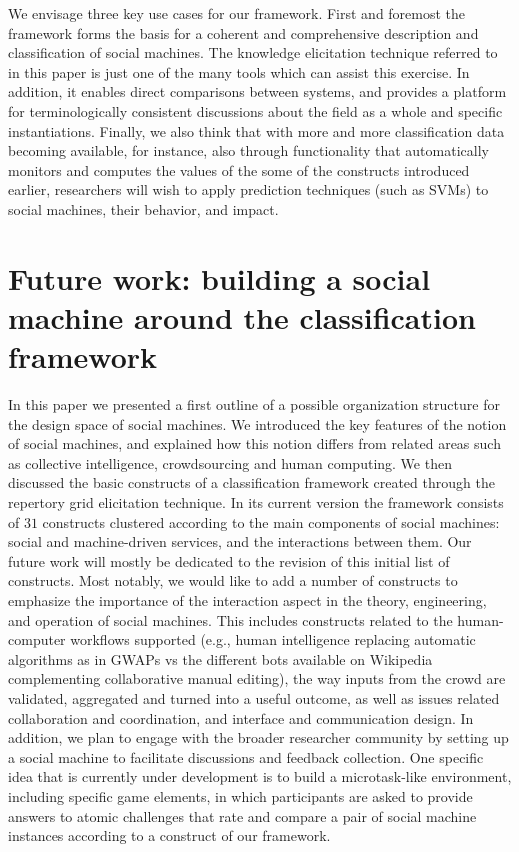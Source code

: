 \documentclass{sig-alternate}
\begin{document}
We envisage three key use cases for our framework. First and foremost the framework forms the basis for a coherent and comprehensive description and classification of social machines. The knowledge elicitation technique referred to in this paper is just one of the many tools which can assist this exercise. In addition, it enables direct comparisons between systems, and provides a platform for terminologically consistent discussions about the field as a whole and specific instantiations. Finally, we also think that with more and more classification data becoming available, for instance, also through functionality that automatically monitors and computes the values of the some of the constructs introduced earlier, researchers will wish to apply prediction techniques (such as SVMs) to social machines, their behavior, and impact.

\section{Future work: building a social machine around the classification framework}
In this paper we presented a first outline of a possible organization structure for the design space of social machines. We introduced the key features of the notion of social machines, and explained how this notion differs from related areas such as collective intelligence, crowdsourcing and human computing. We then discussed the basic constructs of a classification framework created through the repertory grid elicitation technique. In its current version the framework consists of $31$ constructs clustered according to the main components of social machines: social and machine-driven services, and the interactions between them. Our future work will mostly be dedicated to the revision of this initial list of constructs. Most notably, we would like to add a number of constructs to emphasize the importance of the interaction aspect in the theory, engineering, and operation of social machines. This includes constructs related to the human-computer workflows supported (e.g., human intelligence replacing automatic algorithms as in GWAPs vs the different bots available on Wikipedia complementing collaborative manual editing), the way inputs from the crowd are validated, aggregated and turned into a useful outcome, as well as issues related collaboration and coordination, and interface and communication design. In addition, we plan to engage with the broader researcher community by setting up a social machine to facilitate discussions and feedback collection. One specific idea that is currently under development is to build a microtask-like environment, including specific game elements, in which participants are asked to provide answers to atomic challenges that rate and compare a pair of social machine instances according to a construct of our framework.
\end{document}
